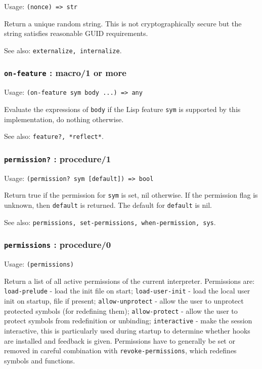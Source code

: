 \documentclass[
]{article}
\newcommand{\passthrough}[1]{#1}
\begin{document}
Usage: \passthrough{\lstinline!(nonce) => str!}

Return a unique random string. This is not cryptographically secure but
the string satisfies reasonable GUID requirements.

See also: \passthrough{\lstinline!externalize, internalize!}.

\hypertarget{on-feature-macro1-or-more}{%
\subsubsection{\texorpdfstring{\texttt{on-feature} : macro/1 or
more}{on-feature : macro/1 or more}}\label{on-feature-macro1-or-more}}

Usage: \passthrough{\lstinline!(on-feature sym body ...) => any!}

Evaluate the expressions of \passthrough{\lstinline!body!} if the Lisp
feature \passthrough{\lstinline!sym!} is supported by this
implementation, do nothing otherwise.

See also: \passthrough{\lstinline!feature?, *reflect*!}.

\hypertarget{permission-procedure1}{%
\subsubsection{\texorpdfstring{\texttt{permission?} :
procedure/1}{permission? : procedure/1}}\label{permission-procedure1}}

Usage: \passthrough{\lstinline!(permission? sym [default]) => bool!}

Return true if the permission for \passthrough{\lstinline!sym!} is set,
nil otherwise. If the permission flag is unknown, then
\passthrough{\lstinline!default!} is returned. The default for
\passthrough{\lstinline!default!} is nil.

See also:
\passthrough{\lstinline!permissions, set-permissions, when-permission, sys!}.

\hypertarget{permissions-procedure0}{%
\subsubsection{\texorpdfstring{\texttt{permissions} :
procedure/0}{permissions : procedure/0}}\label{permissions-procedure0}}

Usage: \passthrough{\lstinline!(permissions)!}

Return a list of all active permissions of the current interpreter.
Permissions are: \passthrough{\lstinline!load-prelude!} - load the init
file on start; \passthrough{\lstinline!load-user-init!} - load the local
user init on startup, file if present;
\passthrough{\lstinline!allow-unprotect!} - allow the user to unprotect
protected symbols (for redefining them);
\passthrough{\lstinline!allow-protect!} - allow the user to protect
symbols from redefinition or unbinding;
\passthrough{\lstinline!interactive!} - make the session interactive,
this is particularly used during startup to determine whether hooks are
installed and feedback is given. Permissions have to generally be set or
removed in careful combination with
\passthrough{\lstinline!revoke-permissions!}, which redefines symbols
and functions.
\end{document}
